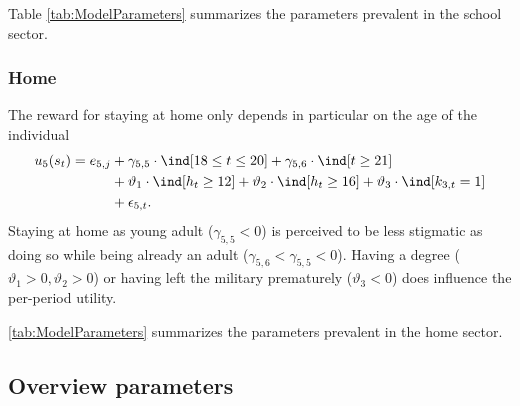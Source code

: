 Table \ref{tab:ModelParameters} summarizes the parameters prevalent in the school sector.


\FloatBarrier\subsubsection{Home}
The reward for staying at home only depends in particular on the age of the individual
%
\begin{align}
    u_5(s_t) =  e_{5,j} & + \gamma_{5,5} \cdot \ind[18 \leq t \leq 20] + \gamma_{5,6} \cdot \ind[t \geq 21] \nonumber \\
    							   & +\vartheta_{1} \cdot \ind[h_t \geq 12] + \vartheta_{2} \cdot \ind[h_t \geq 16] +  \vartheta_3 \cdot \ind[k_{3,t} = 1]  \nonumber \\
    							   & + \epsilon_{5,t}.
\end{align}
%
Staying at home as young adult ($\gamma_{5, 5} < 0$) is perceived to be less stigmatic as doing so while being already an adult ($\gamma_{5,6} < \gamma_{5, 5} <0$). Having a degree  ($\vartheta_1 > 0, \vartheta_2 > 0$) or having left the military prematurely  ($\vartheta_3 <0$) does influence the per-period utility.

\autoref{tab:ModelParameters} summarizes the parameters prevalent in the home sector. 


\FloatBarrier\subsection{Overview parameters}



\clearpage